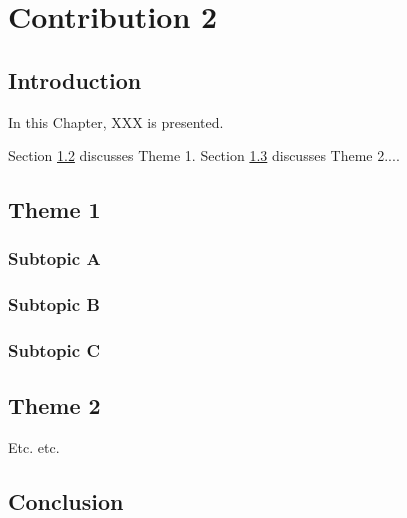 
\chapter{Contribution 2}\label{chap:contrib2}

\section{Introduction}

In this Chapter, XXX is presented.

Section \ref{sec:contrib2:theme1} discusses Theme 1. Section \ref{sec:contrib2:theme2} discusses Theme 2....

\section{Theme 1}\label{sec:contrib2:theme1}

\subsection{Subtopic A}\label{sec:contrib2:theme1:A}

\subsection{Subtopic B}\label{sec:contrib2:theme1:B}

\subsection{Subtopic C}\label{sec:contrib2:theme1:C}

\section{Theme 2}\label{sec:contrib2:theme2}

Etc. etc.

\section{Conclusion}
